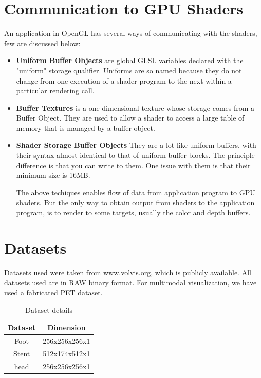 \section{Communication to GPU Shaders}

An application in OpenGL has several ways of communicating with the shaders, few are discussed below: 

\begin{itemize}
\item \textbf{Uniform Buffer Objects} are global GLSL variables declared with the "uniform" storage qualifier. Uniforms are so named because they do not change from one execution of a shader program to the next within a particular rendering call. 

\item \textbf{Buffer Textures} is a one-dimensional texture whose storage comes from a Buffer Object. They are used to allow a shader to access a large table of memory that is managed by a buffer object.

\item \textbf{Shader Storage Buffer Objects} They are a lot like uniform buffers, with their syntax almost identical to that of uniform buffer blocks. The principle difference is that you can write to them. One issue with them is that their minimum size is 16MB.


The above techiques enables flow of data from application program to GPU shaders. But the only way to obtain output from shaders to the  application program, is to render to some targets, usually the color and depth buffers. 

\end{itemize}

\section{Datasets}

Datasets used were taken from www.volvis.org, which is publicly available. All datasets used are in RAW binary format. For multimodal visualization, we have used a fabricated PET dataset.

\begin{table}
\centering
\caption{Dataset details}
\label{tab:pop}
\vspace{2mm}
\begin{tabular}{|c|c|}
\hline
Dataset & Dimension \\
\hline
Foot & 256x256x256x1 \\
\hline
Stent & 512x174x512x1 \\
\hline
head & 256x256x256x1 \\
\hline
\end{tabular}
\end{table} 


